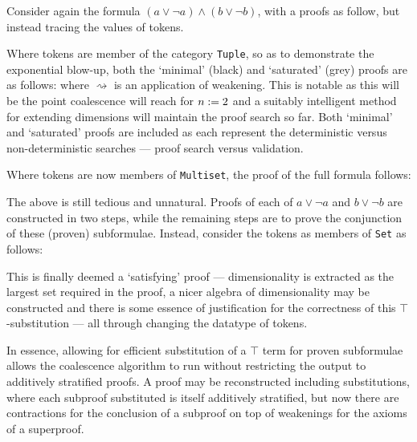     \begin{examples}
        Consider again the formula $(a \vee \neg a) \wedge (b \vee \neg b)$, with a proofs as follow, but instead tracing the values of tokens.
        
        Where tokens are member of the category \texttt{Tuple}, so as to demonstrate the exponential blow-up, both the `minimal' (black) and `saturated' (grey) proofs are as follows:
         where $\rightsquigarrow$ is an application of weakening.
        This is notable as this will be the point coalescence will reach for $n := 2$ and a suitably intelligent method for extending dimensions will maintain the proof search so far.
        Both `minimal' and `saturated' proofs are included as each represent the deterministic versus non-deterministic searches --- proof search versus validation.

        Where tokens are now members of \texttt{Multiset}, the proof of the full formula follows:
        
        The above is still tedious and unnatural.
        Proofs of each of $a \vee \neg a$ and $b \vee \neg b$ are constructed in two steps, while the remaining steps are to prove the conjunction of these (proven) subformulae.
        Instead, consider the tokens as members of \texttt{Set} as follows:

        
        This is finally deemed a `satisfying' proof --- dimensionality is extracted as the largest set required in the proof, a nicer algebra of dimensionality may be constructed and there is some essence of justification for the correctness of this $\top$-substitution --- all through changing the datatype of tokens.
    \end{examples}
    
    \begin{remark}
        In essence, allowing for efficient substitution of a $\top$ term for proven subformulae allows the coalescence algorithm to run without restricting the output to additively stratified proofs.
        A proof may be reconstructed including substitutions, where each subproof substituted is itself additively stratified, but now there are contractions for the conclusion of a subproof on top of weakenings for the axioms of a superproof.
    \end{remark}


